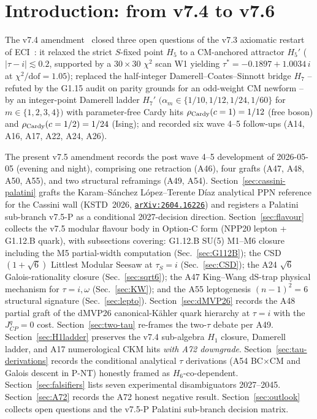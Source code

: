 \documentclass[a4paper,11pt]{article}
\newcommand{\arXiv}[1]{\href{https://arxiv.org/abs/#1}{\texttt{arXiv:#1}}}
\theoremstyle{definition}
\theoremstyle{remark}
\begin{document}
\section{Introduction: from v7.4 to v7.6}
\label{sec:intro}

The v7.4 amendment~\cite{V74amend} closed three open questions of
the v7.3 axiomatic restart of ECI~\cite{ECIv6053}: it relaxed the
strict $S$-fixed point $H_5$ to a CM-anchored attractor $H_5'$
($|\tau-i|\lesssim 0.2$, supported by a $30\times 30$ $\chi^2$ scan
W1 yielding $\tau^{*}=-0.1897+1.0034\,i$ at
$\chi^2/\mathrm{dof}=1.05$); replaced the half-integer
Damerell--Coates--Sinnott bridge $H_7$ -- refuted by the G1.15 audit
on parity grounds for an odd-weight CM newform -- by an
integer-point Damerell ladder $H_7'$
$(\alpha_m\in\{1/10,1/12,1/24,1/60\}$ for $m\in\{1,2,3,4\})$ with
parameter-free Cardy hits $\rho_{\rm Cardy}(c=1)=1/12$ (free boson)
and $\rho_{\rm Cardy}(c=1/2)=1/24$ (Ising); and recorded six wave
4--5 follow-ups (A14, A16, A17, A22, A24, A26).

The present v7.5 amendment records the post wave 4--5 development
of 2026-05-05 (evening and night), comprising one retraction
(A46), four grafts (A47, A48, A50, A55), and two structural
reframings (A49, A54).  Section~\ref{sec:cassini-palatini} grafts
the Karam--S\'anchez L\'opez--Terente D\'iaz analytical PPN
reference for the Cassini wall (KSTD~2026, \arXiv{2604.16226})
and registers a Palatini sub-branch v7.5-P as a conditional
2027-decision direction.  Section~\ref{sec:flavour} collects the
v7.5 modular flavour body in Option-C form (NPP20 lepton + G1.12.B
quark), with subsections covering: G1.12.B SU(5) M1--M6 closure
including the M5 partial-width computation
(Sec.~\ref{sec:G112B}); the CSD$(1+\sqrt 6)$ Littlest Modular
Seesaw at $\tau_S=i$ (Sec.~\ref{sec:CSD}); the A24 $\sqrt 6$
Galois-rationality closure (Sec.~\ref{sec:sqrt6}); the A47
King--Wang dS-trap physical mechanism for $\tau=i,\omega$
(Sec.~\ref{sec:KW}); and the A55 leptogenesis $(n-1)^2=6$
structural signature (Sec.~\ref{sec:lepto}).
Section~\ref{sec:dMVP26} records the A48 partial graft of the
dMVP26 canonical-K\"ahler quark hierarchy at $\tau=i$ with the
$J_{CP}^{q}=0$ cost.  Section~\ref{sec:two-tau} re-frames the
two-$\tau$ debate per A49.  Section~\ref{sec:H1ladder} preserves
the v7.4 sub-algebra $H_1$ closure, Damerell ladder, and A17
numerological CKM hits \emph{with A72 downgrade}.
Section~\ref{sec:tau-derivations}
records the conditional analytical $\tau$ derivations (A54
BC$\times$CM and Galois descent in P-NT) honestly framed as
$H_6$-co-dependent.  Section~\ref{sec:falsifiers} lists seven
experimental disambiguators 2027--2045.  Section~\ref{sec:A72}
records the A72 honest negative result.  Section~\ref{sec:outlook}
collects open questions and the v7.5-P Palatini sub-branch
decision matrix.
\end{document}
